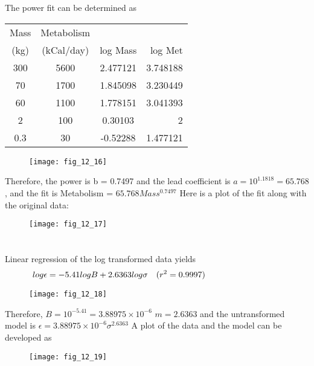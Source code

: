 \documentclass[../main.tex]{subfiles}
\begin{document}
\section{}
The power fit can be determined as
\bigbreak
		\begin{tabular}{|c|c|c|r|}
		\hline Mass&Metabolism&{}&{}\\
			(kg)&(kCal/day)&log Mass&log Met\\ \hline
			300&5600&2.477121&3.748188\\ \hline
			70&1700&1.845098&3.230449\\ \hline
			60&1100&1.778151&3.041393\\ \hline
			2&100&0.30103&2\\ \hline
			0.3&30&-0.52288&1.477121\\ \hline
	\end{tabular}
	\begin{figure}[H]
		\texttt{[image: fig\_12\_16]}
		\label{fig:fig_12_16}
	\end{figure}
	\bigbreak
Therefore, the power is b = 0.7497 and the lead coefficient is $a = 10^{1.1818} = 65.768$, and the fit is
	\bigbreak
Metabolism = $65.768Mass^{0.7497}$
	\bigbreak
Here is a plot of the fit along with the original data: 
	\begin{figure}[H]
		\texttt{[image: fig\_12\_17]}
		\label{fig:fig_12_17}
	\end{figure}
	\bigbreak



\section{}
Linear regression of the log transformed data yields
\bigbreak
\begin{align*}
\hspace{-2.8cm}log \epsilon &= -5.41 log B + 2.6363log\sigma & (r^2 &= 0.9997)
\end{align*}
	\begin{figure}[H]
		\texttt{[image: fig\_12\_18]}
		\label{fig:fig_12_18}
	\end{figure}
	\bigbreak
Therefore,
	\bigbreak
$B=10^{-5.41}=3.88975\times 10^{-6}$
	\bigbreak
$m=2.6363$
	\bigbreak
and the untransformed model is
	\bigbreak
$\epsilon=3.88975\times10^{-6}\sigma^{2.6363}$
	\bigbreak
A plot of the data and the model can be developed as
	\begin{figure}[H]
		\texttt{[image: fig\_12\_19]}
		\label{fig:fig_12_19}
	\end{figure}
	\bigbreak
\end{document}
